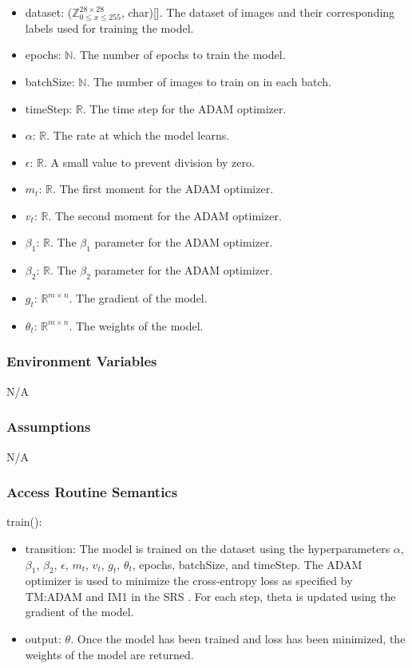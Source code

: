 \documentclass[12pt, titlepage]{article}
\begin{document}
\begin{itemize}
  \item dataset: ($\mathbb{Z}^{28 \times 28}_{0 \le x \le 255}$, char)[]. The
  dataset of images and their corresponding labels used for training the model.
  \item epochs: $\mathbb{N}$. The number of epochs to train the model.
  \item batchSize: $\mathbb{N}$. The number of images to train on in each batch.
  \item timeStep: $\mathbb{R}$. The time step for the ADAM optimizer.
  \item $\alpha$: $\mathbb{R}$. The rate at which the model learns.
  \item $\epsilon$: $\mathbb{R}$. A small value to prevent division by zero.
  \item $m_{t}$: $\mathbb{R}$. The first moment for the ADAM optimizer.
  \item $v_{t}$: $\mathbb{R}$. The second moment for the ADAM optimizer.
  \item $\beta_1$: $\mathbb{R}$. The $\beta_1$ parameter for the ADAM optimizer.
  \item $\beta_2$: $\mathbb{R}$. The $\beta_2$ parameter for the ADAM optimizer.
  \item $g_{t}$: $\mathbb{R}^{m \times n}$. The gradient of the model. 
  \item $\theta_{t}$: $\mathbb{R}^{m \times n}$. The weights of the model.
\end{itemize}

\subsubsection{Environment Variables}

N/A

\subsubsection{Assumptions}

N/A

\subsubsection{Access Routine Semantics}

\noindent train():
\begin{itemize}
\item transition: The model is trained on the dataset using the hyperparameters
$\alpha$, $\beta_1$, $\beta_2$, $\epsilon$, $m_{t}$, $v_{t}$, $g_{t}$,
$\theta_{t}$, epochs, batchSize, and timeStep. The ADAM optimizer is used to
minimize the cross-entropy loss as specified by TM:ADAM \cite[4.2.2]{SRS} and
IM1 in the SRS \cite[4.2.4]{SRS}. For each step, theta is updated using the
gradient of the model.
\item output: $\theta$. Once the model has been trained and loss has been
minimized, the weights of the model are returned.
\end{itemize}
\end{document}
